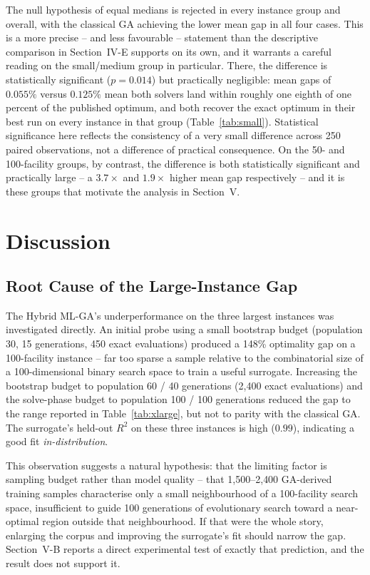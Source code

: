 \documentclass[conference]{IEEEtran}
\begin{document}
The null hypothesis of equal medians is rejected in every instance group and
overall, with the classical GA achieving the lower mean gap in all four cases.
This is a more precise -- and less favourable -- statement than the
descriptive comparison in Section~IV-E supports on its own, and it warrants a
careful reading on the small/medium group in particular. There, the difference
is statistically significant ($p = 0.014$) but practically negligible: mean
gaps of $0.055\%$ versus $0.125\%$ mean both solvers land within roughly one
eighth of one percent of the published optimum, and both recover the exact
optimum in their best run on every instance in that group
(Table~\ref{tab:small}). Statistical significance here reflects the
consistency of a very small difference across 250 paired observations, not a
difference of practical consequence. On the 50- and 100-facility groups, by
contrast, the difference is both statistically significant and practically
large -- a $3.7\times$ and $1.9\times$ higher mean gap respectively -- and it
is these groups that motivate the analysis in Section~V.

\section{Discussion}

\subsection{Root Cause of the Large-Instance Gap}

The Hybrid ML-GA's underperformance on the three largest instances was
investigated directly. An initial probe using a small bootstrap budget
(population 30, 15 generations, 450 exact evaluations) produced a 148\%
optimality gap on a 100-facility instance -- far too sparse a sample relative
to the combinatorial size of a 100-dimensional binary search space to train a
useful surrogate. Increasing the bootstrap budget to population 60 / 40
generations (2{,}400 exact evaluations) and the solve-phase budget to
population 100 / 100 generations reduced the gap to the range reported in
Table~\ref{tab:xlarge}, but not to parity with the classical GA. The
surrogate's held-out $R^2$ on these three instances is high ($0.99$),
indicating a good fit \emph{in-distribution}.

This observation suggests a natural hypothesis: that the limiting factor is
sampling budget rather than model quality -- that 1{,}500--2{,}400 GA-derived
training samples characterise only a small neighbourhood of a 100-facility
search space, insufficient to guide 100 generations of evolutionary search
toward a near-optimal region outside that neighbourhood. If that were the
whole story, enlarging the corpus and improving the surrogate's fit should
narrow the gap. Section~V-B reports a direct experimental test of exactly that
prediction, and the result does not support it.
\end{document}
